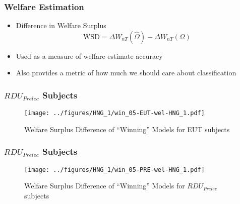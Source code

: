 \documentclass{beamer}
\begin{document}
\begin{frame}
\frametitle{Welfare Estimation}
\begin{itemize}
	\item Difference in Welfare Surplus
	\begin{equation}
		\label{eq4:wsurplusDiff}
		\text{WSD} = \Delta W_{nT}(\hat{\Omega}) - \Delta W_{nT}(\Omega)
	\end{equation}
	\item Used as a measure of welfare estimate accuracy
	\item Also provides a metric of how much we should care about classification
\end{itemize}
\end{frame}
%
%
\begin{frame}
\frametitle{ $\mathit{RDU_{Prelec}}$ Subjects}
\begin{figure}[hb!]
	\center
	\caption{Welfare Surplus Difference of \enquote{Winning} Models for EUT subjects}
	\texttt{[image: ../figures/HNG\_1/win\_05-EUT-wel-HNG\_1.pdf]}
	\label{fig:HN1_wel_eut}
\end{figure}
\end{frame}

\begin{frame}
\frametitle{ $\mathit{RDU_{Prelec}}$ Subjects}
\begin{figure}[hb!]
	\center
	\caption{Welfare Surplus Difference of \enquote{Winning} Models for $\mathit{RDU_{Prelec}}$ subjects}
	\texttt{[image: ../figures/HNG\_1/win\_05-PRE-wel-HNG\_1.pdf]}
	\label{fig:HN1_wel_eut}
\end{figure}
\end{frame}
\end{document}
